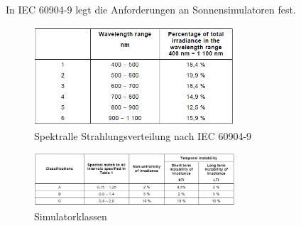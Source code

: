 \documentclass[a4paper,bibtotoc,oneside]{scrbook}
\begin{document}
In IEC 60904-9 legt die Anforderungen an Sonnensimulatoren fest.

\begin{figure}[htbp]
\centering
\includegraphics[width=75mm]{img/spectral.png}
\caption[Spektralle Strahlungsverteilung]{Spektralle Strahlungsverteilung nach IEC 60904-9}\label{sectral}
\end{figure}

\begin{figure}[htbp]
\centering
\includegraphics[width=75mm]{img/simclass.png}
\caption[Simulatorklassen]{Simulatorklassen}\label{Sim2}
\end{figure}
\end{document}
